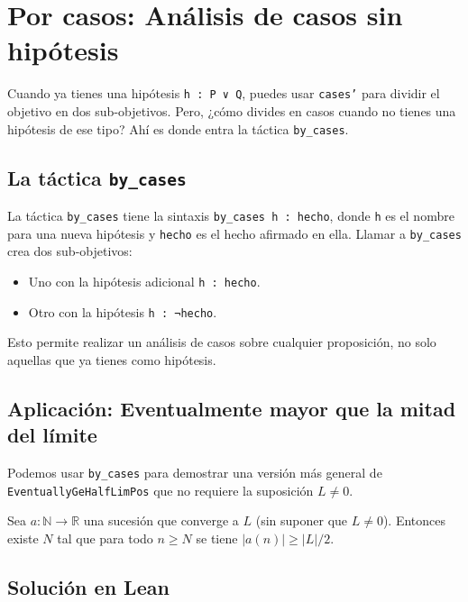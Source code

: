 \section{Por casos: Análisis de casos sin hipótesis}

Cuando ya tienes una hipótesis \texttt{h : P ∨ Q}, puedes usar
\texttt{cases'} para dividir el objetivo en dos sub-objetivos. Pero,
¿cómo divides en casos cuando no tienes una hipótesis de ese tipo? Ahí es
donde entra la táctica \texttt{by\_cases}.

\subsection{La táctica \texttt{by\_cases}}

La táctica \texttt{by\_cases} tiene la sintaxis
\texttt{by\_cases h : hecho}, donde \texttt{h} es el nombre para una
nueva hipótesis y \texttt{hecho} es el hecho afirmado en ella. Llamar a
\texttt{by\_cases} crea dos sub-objetivos:

\begin{itemize}
  \item Uno con la hipótesis adicional \texttt{h : hecho}.
  \item Otro con la hipótesis \texttt{h : ¬hecho}.
\end{itemize}

Esto permite realizar un análisis de casos sobre cualquier proposición,
no solo aquellas que ya tienes como hipótesis.

\subsection{Aplicación: Eventualmente mayor que la mitad del límite}

Podemos usar \texttt{by\_cases} para demostrar una versión más general de
\texttt{EventuallyGeHalfLimPos} que no requiere la suposición $L \neq 0$.

\begin{theorem}
Sea $a : \mathbb{N} \to \mathbb{R}$ una sucesión que converge a $L$ (sin
suponer que $L \neq 0$). Entonces existe $N$ tal que para todo
$n \geq N$ se tiene $|a(n)| \geq |L|/2$.
\end{theorem}

\subsection{Solución en Lean}

